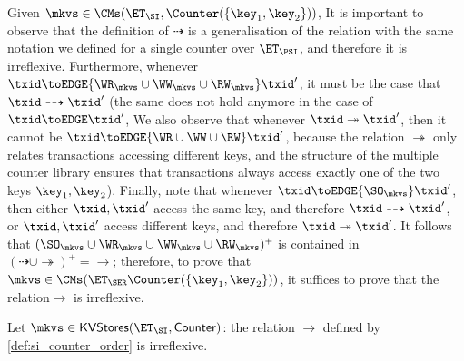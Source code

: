 Given $\mkvs \in \CMs(\ET_{\SI}, \Counter(\{\key_1, \key_2\}))$, 
It is important to observe that the definition of $\dashrightarrow$ is a generalisation of the relation 
with the same notation we defined for a single counter over $\ET_{\PSI}$, and therefore it is irreflexive. 
Furthermore, whenever $\txid \toEDGE{\WR_{\mkvs} \cup \WW_{\mkvs} \cup \RW_{\mkvs}} \txid'$, it must be the case that 
$\txid \dashrightarrow \txid'$ (the same does not hold anymore in the case of $\txid \toEDGE \txid'$, 
We also observe that whenever $\txid \twoheadrightarrow \txid'$, then it cannot be $\txid \toEDGE{\WR \cup \WW \cup \RW} \txid'$, 
because the relation $\twoheadrightarrow$ only relates transactions accessing different keys, and the structure of 
the multiple counter library ensures that transactions always access exactly one of the two keys $\key_1, \key_2$). 
Finally, note that whenever $\txid \toEDGE{\SO_{\mkvs}} \txid'$, then either $\txid, \txid'$ access the same 
key, and therefore $\txid \dashrightarrow \txid'$, or $\txid, \txid'$ access different keys, and therefore 
$\txid \twoheadrightarrow \txid'$. It follows that $(\SO_{\mkvs} \cup \WR_{\mkvs} \cup \WW_{\mkvs} \cup \RW_{\mkvs})^{+}$ 
is contained in $(\dashrightarrow \cup \twoheadrightarrow)^{+} = \rightarrow$; therefore, 
to prove that $\mkvs \in \CMs(\ET_{\SER}  \Counter(\{\key_1, \key_2\}))$, it suffices to prove that 
the relation$\rightarrow$ is irreflexive.
%

\begin{proposition}
Let $\mkvs \in \mathsf{KVStores}(\ET_{\SI}, \mathsf{Counter})$: the relation $\rightarrow$ 
defined by \cref{def:si_counter_order} is irreflexive.
\end{proposition}

